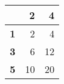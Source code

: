 \begin{tabular}{lrr}
\toprule
{} &   2 &   4 \\
\midrule
\textbf{1} &   2 &   4 \\
\textbf{3} &   6 &  12 \\
\textbf{5} &  10 &  20 \\
\bottomrule
\end{tabular}
